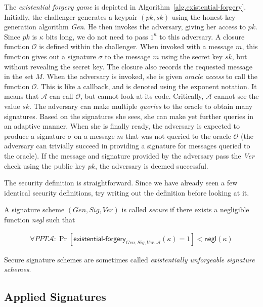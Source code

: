 The \emph{existential forgery game} is depicted in Algorithm~\ref{alg.existential-forgery}.
Initially, the challenger generates a keypair $(pk, sk)$ using the honest key generation
algorithm \emph{Gen}. He then invokes the adversary, giving her access to $pk$. Since
$pk$ is $\kappa$ bits long, we do not need to pass $1^\kappa$ to this adversary.
A closure function $\mathcal{O}$ is defined within the challenger. When invoked
with a message $m$, this function gives out a signature $\sigma$ to the message
$m$ using the secret key $sk$, but without revealing the secret key. The closure
also records the requested message in the set $M$.
When the adversary is invoked, she is given \emph{oracle access} to call the
function $\mathcal{O}$. This is like a callback, and is denoted using the
exponent notation. It means that $\mathcal{A}$ can call $\mathcal{O}$, but
cannot look at its code. Critically, $\mathcal{A}$ cannot see the value $sk$.
The adversary can make multiple \emph{queries} to the oracle to obtain many
signatures. Based on the signatures she sees, she can make yet further queries
in an adaptive manner. When she is finally ready, the adversary is expected
to produce a signature $\sigma$ on a message $m$ that was not queried to the
oracle $\mathcal{O}$ (the adversary can trivially succeed in providing a signature
for messages queried to the oracle). If the message and signature provided by
the adversary pass the \emph{Ver} check using the public key $pk$, the adversary
is deemed successful.

The security definition is straightforward. Since we have already seen a few
identical security definitions, try writing out the definition before looking
at it.

\begin{definition}
  A signature scheme $(Gen, Sig, Ver)$ is called \emph{secure} if there
  exists a negligible function \emph{negl} such that

  \begin{align*}
    \forall PPT \mathcal{A}:
    \Pr[\textsf{existential-forgery}_{Gen, Sig, Ver, \mathcal{A}}(\kappa) = 1] < \textsf{negl}(\kappa)
  \end{align*}
\end{definition}

Secure signature schemes are sometimes called \emph{existentially unforgeable signature
schemes}.

\subsection*{Applied Signatures}

